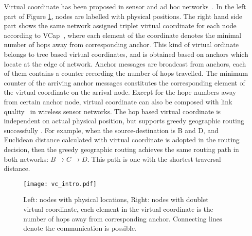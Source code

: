 Virtual coordinate has been proposed in sensor and ad hoc networks~\cite{gpsfree05infocom,Alizai_11_probabilisticAddressing}.
In the left part of Figure \ref{fig:vc_intro}, nodes are labelled with physical positions.
The right hand side part shows the same network assigned triplet virtual coordinate for each node according to VCap~\cite{gpsfree05infocom}, where each element of the coordinate denotes the minimal number of hops away from corresponding anchor.
This kind of virtual ordinate belongs to tree based virtual coordinates, and is obtained based on anchors which locate at the edge of network.
Anchor messages are broadcast from anchors, each of them contains a counter recording the number of hops travelled.
The minimum counter of the arriving anchor messages constitutes the corresponding element of the virtual coordinate on the arrival node.
Except for the hope numbers away from certain anchor node, virtual coordinate can also be composed with link quality~\cite{Alizai_11_probabilisticAddressing} in wireless sensor networks.
The hop based virtual coordinate is independent on actual physical position, but %
supports greedy geographic routing successfully \cite{gpsfree05infocom, Alizai_11_probabilisticAddressing}.
For example, when the source-destination is B and D, and Euclidean distance calculated with virtual coordinate is adopted in the routing decision, then the greedy geographic routing achieves the same routing path in both networks: $B\rightarrow C\rightarrow D$. This path is one with the shortest traversal distance.


\begin{figure}
\centering
\texttt{[image: vc\_intro.pdf]}
\caption{Left: nodes with physical locations, Right: nodes with doublet virtual coordinate, each element in the virtual coordinate is the number of hops away from corresponding anchor. Connecting lines denote the communication is possible.}
\label{fig:vc_intro}
\end{figure}


